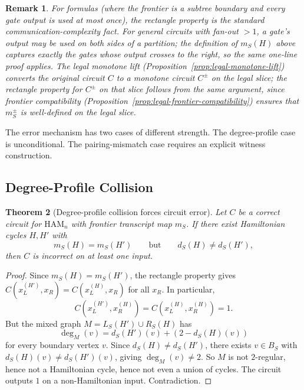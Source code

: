 \documentclass[11pt]{article}
\newtheorem{theorem}{Theorem}[section]
\newtheorem{remark}[theorem]{Remark}
\newcommand{\Ham}{\mathrm{HAM}}
\begin{document}
\begin{remark}
\label{rem:rectangle-general-circuit}
For formulas (where the frontier is a subtree boundary and every gate output is used at most once),
the rectangle property is the standard communication-complexity fact.  For general circuits with
fan-out $> 1$, a gate's output may be used on both sides of a partition; the definition of
$m_S(H)$ above captures exactly the gates whose output crosses to the right, so the same
one-line proof applies.  The legal monotone lift
(Proposition~\ref{prop:legal-monotone-lift}) converts the original circuit $C$ to a monotone
circuit $C^\pm$ on the legal slice; the rectangle property for $C^\pm$ on that slice follows
from the same argument, since frontier compatibility
(Proposition~\ref{prop:legal-frontier-compatibility}) ensures that $m_S^{\pm}$ is well-defined
on the legal slice.
\end{remark}

The error mechanism has two cases of different strength.
The degree-profile case is unconditional.  The
pairing-mismatch case requires an explicit witness
construction.

\subsection{Degree-Profile Collision}

\begin{theorem}[Degree-profile collision forces circuit
error]
\label{thm:degree-collision}
Let $C$ be a correct circuit for $\Ham_n$ with frontier
transcript map $m_S$.  If there exist Hamiltonian cycles
$H, H'$ with
\[
  m_S(H) = m_S(H')
  \qquad\text{but}\qquad
  d_S(H) \neq d_S(H'),
\]
then $C$ is incorrect on at least one input.
\end{theorem}

\begin{proof}
Since $m_S(H) = m_S(H')$, the rectangle property gives
$C(x_L^{(H')}, x_R) = C(x_L^{(H)}, x_R)$ for all $x_R$.
In particular,
\[
  C(x_L^{(H')}, x_R^{(H)})
  = C(x_L^{(H)}, x_R^{(H)}) = 1.
\]
But the mixed graph $M = L_S(H') \cup R_S(H)$ has
\[
  \deg_M(v) = d_S(H')(v) + (2 - d_S(H)(v))
\]
for every boundary vertex $v$.
Since $d_S(H) \neq d_S(H')$, there exists $v \in B_S$
with $d_S(H)(v) \neq d_S(H')(v)$, giving
$\deg_M(v) \neq 2$.
So $M$ is not $2$-regular, hence not a Hamiltonian cycle,
hence not even a union of cycles.
The circuit outputs $1$ on a non-Hamiltonian input.
Contradiction.
\end{proof}
\end{document}
